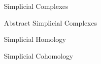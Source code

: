 \documentclass[../main.tex]{subfiles}
\begin{document}
    \begin{section}{Simplicial Complexes} 
            
    \end{section}
    \newpage
    \begin{section}{Abstract Simplicial Complexes} 
            
    \end{section}
    \newpage
    \begin{section}{Simplicial Homology}
            
    \end{section}
    \newpage
    \begin{section}{Simplicial Cohomology}
         
    \end{section}
\end{document}
